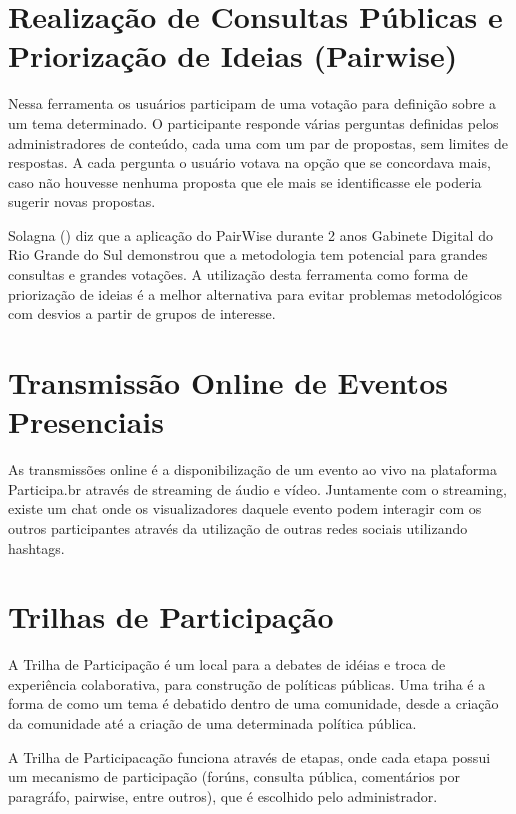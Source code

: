 \section*{Realização de Consultas Públicas e Priorização de Ideias (Pairwise)}

Nessa ferramenta os usuários participam de uma votação para definição sobre a um tema determinado. O participante responde várias perguntas definidas pelos administradores de conteúdo, cada uma com um par de propostas, sem limites de respostas. A cada pergunta o usuário votava na opção que se concordava mais, caso não houvesse nenhuma proposta que ele mais se identificasse ele poderia sugerir novas propostas.

Solagna (\citeyear{solagna2014metodologias}) diz que a aplicação do PairWise durante 2 anos Gabinete Digital do Rio Grande do Sul demonstrou que a metodologia tem potencial para grandes consultas e grandes votações. A utilização desta ferramenta como forma de priorização de ideias é a melhor alternativa para evitar problemas metodológicos com desvios a partir de grupos de interesse.

\section*{Transmissão Online de Eventos Presenciais}

As transmissões online é a disponibilização de um evento ao vivo na plataforma Participa.br através de streaming de áudio e vídeo. Juntamente com o streaming, existe um chat onde os visualizadores daquele evento podem interagir com os outros participantes através da utilização de outras redes sociais utilizando hashtags.

\section*{Trilhas de Participação}

A Trilha de Participação é um local para a debates de idéias e troca de experiência colaborativa, para construção de políticas públicas. Uma triha é a forma de como um tema é debatido dentro de uma comunidade, desde a criação da comunidade até a criação de uma determinada política pública.

A Trilha de Participacação funciona através de etapas, onde cada etapa possui um mecanismo de participação (forúns, consulta pública, comentários por paragráfo, pairwise, entre outros), que é escolhido pelo administrador. 
